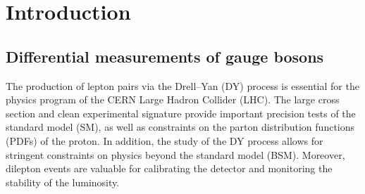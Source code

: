 \chapter{Introduction}
\section{Differential measurements of gauge bosons}
The production of lepton pairs via the Drell--Yan (DY) process 
is essential for the physics program of the CERN Large Hadron Collider (LHC).  
The large cross section and clean experimental signature %
provide important precision
tests of the standard model (SM),
as well as constraints on the 
parton distribution functions (PDFs) of the proton. In addition, the study of 
the DY process allows for stringent constraints on physics beyond the standard 
model (BSM).
Moreover, dilepton events are valuable for calibrating the 
detector and monitoring the stability of the luminosity.

